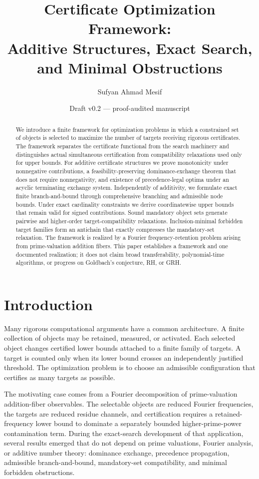 \documentclass[11pt]{article}
\title{Certificate Optimization Framework:\\Additive Structures, Exact Search, and Minimal Obstructions}
\author{Sufyan Ahmad Mesif}
\date{Draft v0.2 --- proof-audited manuscript}
\theoremstyle{definition}
\theoremstyle{remark}
\begin{document}
\maketitle

\begin{abstract}
We introduce a finite framework for optimization problems in which a constrained set of objects is selected to maximize the number of targets receiving rigorous certificates. The framework separates the certificate functional from the search machinery and distinguishes actual simultaneous certification from compatibility relaxations used only for upper bounds. For additive certificate structures we prove monotonicity under nonnegative contributions, a feasibility-preserving dominance-exchange theorem that does not require nonnegativity, and existence of precedence-legal optima under an acyclic terminating exchange system. Independently of additivity, we formulate exact finite branch-and-bound through comprehensive branching and admissible node bounds. Under exact cardinality constraints we derive coordinatewise upper bounds that remain valid for signed contributions. Sound mandatory object sets generate pairwise and higher-order target-compatibility relaxations. Inclusion-minimal forbidden target families form an antichain that exactly compresses the mandatory-set relaxation. The framework is realized by a Fourier frequency-retention problem arising from prime-valuation addition fibers. This paper establishes a framework and one documented realization; it does not claim broad transferability, polynomial-time algorithms, or progress on Goldbach's conjecture, RH, or GRH.
\end{abstract}

\section{Introduction}

Many rigorous computational arguments have a common architecture. A finite collection of objects may be retained, measured, or activated. Each selected object changes certified lower bounds attached to a finite family of targets. A target is counted only when its lower bound crosses an independently justified threshold. The optimization problem is to choose an admissible configuration that certifies as many targets as possible.

The motivating case comes from a Fourier decomposition of prime-valuation addition-fiber observables. The selectable objects are reduced Fourier frequencies, the targets are reduced residue channels, and certification requires a retained-frequency lower bound to dominate a separately bounded higher-prime-power contamination term. During the exact-search development of that application, several results emerged that do not depend on prime valuations, Fourier analysis, or additive number theory: dominance exchange, precedence propagation, admissible branch-and-bound, mandatory-set compatibility, and minimal forbidden obstructions.
\end{document}
